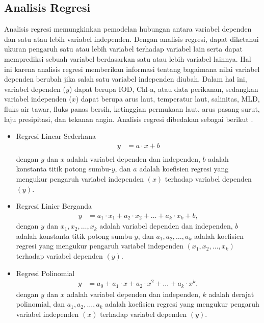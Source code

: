 \begin{spacing}{1.5}
		\subsection[Analisis Regresi]{Analisis Regresi}
		Analisis regresi memungkinkan pemodelan hubungan antara variabel dependen dan satu atau lebih variabel independen. Dengan analisis regresi, dapat diketahui ukuran pengaruh satu atau lebih variabel terhadap variabel lain serta dapat memprediksi sebuah variabel berdasarkan satu atau lebih variabel lainnya. Hal ini karena analisis regresi memberikan informasi tentang bagaimana nilai variabel dependen berubah jika salah satu variabel independen diubah. Dalam hal ini, variabel dependen ($y$) dapat berupa IOD, Chl-a, atau data perikanan, sedangkan variabel independen ($x$) dapat berupa arus laut, temperatur laut, salinitas, MLD, fluks air tawar, fluks panas bersih, ketinggian permukaan laut, arus pasang surut, laju presipitasi, dan tekanan angin.  Analisis regresi dibedakan sebagai berikut  \cite{ANGELINI2019722}.
		\begin{itemize}
			\item Regresi Linear Sederhana
			\begin{equation}
				\begin{aligned}
					y &= a \cdot x+b\\
				\end{aligned}
			\end{equation}
			dengan $y$ dan $x$ adalah variabel dependen dan independen, $b$ adalah konstanta titik potong sumbu-$y$, dan $a$ adalah koefisien regresi yang mengukur pengaruh variabel independen $(x)$ terhadap variabel dependen $(y)$.
			\item Regresi Linier Berganda
			\begin{equation}
				\begin{aligned}
					y &= a_1 \cdot x_1+a_2 \cdot x_2+\dots+a_k \cdot x_k+b,
				\end{aligned}
			\end{equation}
			dengan $y$ dan $x_1,x_2,\dots,x_k$ adalah variabel dependen dan independen, $b$ adalah konstanta titik potong sumbu-$y$, dan $a_1,a_2,\dots,a_k$ adalah koefisien regresi yang mengukur pengaruh variabel independen $(x_1,x_2,\dots,x_k)$ terhadap variabel dependen $(y)$.
			\item Regresi Polinomial
			\begin{equation}
				\begin{aligned}
					y &= a_0+a_1 \cdot x+a_2 \cdot x^2+\dots+a_k \cdot x^k,
				\end{aligned}
			\end{equation}
			dengan $y$ dan $x$ adalah variabel dependen dan independen, $k$ adalah derajat polinomial, dan $a_1,a_2,\dots,a_k$ adalah koefisien regresi yang mengukur pengaruh variabel independen $(x)$ terhadap variabel dependen $(y)$.
		\end{itemize}
	

\end{spacing}
